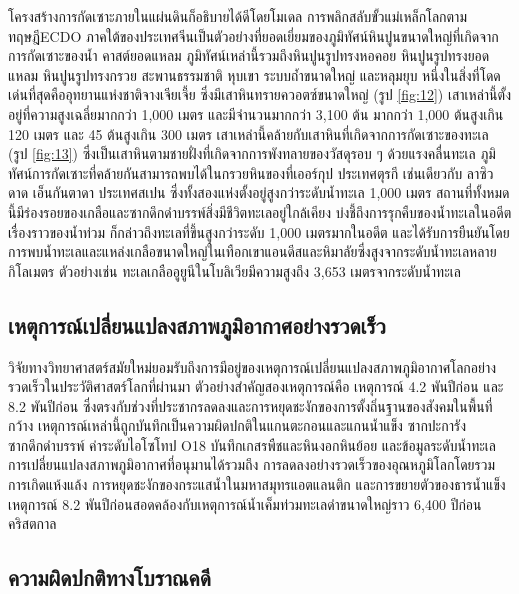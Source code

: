 \documentclass[10pt,twocolumn,letterpaper]{article}
\begin{document}
โครงสร้างการกัดเซาะภายในแผ่นดินก็อธิบายได้ดีโดยโมเดล การพลิกสลับขั้วแม่เหล็กโลกตามทฤษฎีECDO
 ภาคใต้ของประเทศจีนเป็นตัวอย่างที่ยอดเยี่ยมของภูมิทัศน์หินปูนขนาดใหญ่ที่เกิดจากการกัดเซาะของน้ำ \cite{82}  คาสต์ยอดแหลม ภูมิทัศน์เหล่านี้รวมถึงหินปูนรูปทรงหอคอย หินปูนรูปทรงยอดแหลม หินปูนรูปทรงกรวย สะพานธรรมชาติ หุบเขา ระบบถ้ำขนาดใหญ่ และหลุมยุบ หนึ่งในสิ่งที่โดดเด่นที่สุดคืออุทยานแห่งชาติจางเจียเจี้ย ซึ่งมีเสาหินทรายควอตซ์ขนาดใหญ่ (รูป \ref{fig:12}) \cite{84} เสาเหล่านี้ตั้งอยู่ที่ความสูงเฉลี่ยมากกว่า 1,000 เมตร และมีจำนวนมากกว่า 3,100 ต้น มากกว่า 1,000 ต้นสูงเกิน 120 เมตร และ 45 ต้นสูงเกิน 300 เมตร \cite{85} เสาเหล่านี้คล้ายกับเสาหินที่เกิดจากการกัดเซาะของทะเล  (รูป \ref{fig:13}) ซึ่งเป็นเสาหินตามชายฝั่งที่เกิดจากการพังทลายของวัสดุรอบ ๆ ด้วยแรงคลื่นทะเล ภูมิทัศน์การกัดเซาะที่คล้ายกันสามารถพบได้ในกรวยหินของที่เออร์กุป ประเทศตุรกี เช่นเดียวกับ ลาซิวดาด เอ็นกันตาดา ประเทศสเปน ซึ่งทั้งสองแห่งตั้งอยู่สูงกว่าระดับน้ำทะเล 1,000 เมตร สถานที่ทั้งหมดนี้มีร่องรอยของเกลือและซากดึกดำบรรพ์สิ่งมีชีวิตทะเลอยู่ใกล้เคียง บ่งชี้ถึงการรุกคืบของน้ำทะเลในอดีต \cite{15,86,87} เรื่องราวของน้ำท่วม \cite{3} ก็กล่าวถึงทะเลที่ขึ้นสูงกว่าระดับ 1,000 เมตรมากในอดีต และได้รับการยืนยันโดยการพบน้ำทะเลและแหล่งเกลือขนาดใหญ่ในเทือกเขาแอนดีสและหิมาลัยซึ่งสูงจากระดับน้ำทะเลหลายกิโลเมตร ตัวอย่างเช่น ทะเลเกลืออูยูนีในโบลิเวียมีความสูงถึง 3,653 เมตรจากระดับน้ำทะเล \cite{94}

\subsection{เหตุการณ์เปลี่ยนแปลงสภาพภูมิอากาศอย่างรวดเร็ว}

วิจัยทางวิทยาศาสตร์สมัยใหม่ยอมรับถึงการมีอยู่ของเหตุการณ์เปลี่ยนแปลงสภาพภูมิอากาศโลกอย่างรวดเร็วในประวัติศาสตร์โลกที่ผ่านมา ตัวอย่างสำคัญสองเหตุการณ์คือ เหตุการณ์ 4.2 พันปีก่อน และ 8.2 พันปีก่อน ซึ่งตรงกับช่วงที่ประชากรลดลงและการหยุดชะงักของการตั้งถิ่นฐานของสังคมในพื้นที่กว้าง เหตุการณ์เหล่านี้ถูกบันทึกเป็นความผิดปกติในแกนตะกอนและแกนน้ำแข็ง ซากปะการังซากดึกดำบรรพ์ ค่าระดับไอโซโทป O18 บันทึกเกสรพืชและหินงอกหินย้อย และข้อมูลระดับน้ำทะเล การเปลี่ยนแปลงสภาพภูมิอากาศที่อนุมานได้รวมถึง การลดลงอย่างรวดเร็วของอุณหภูมิโลกโดยรวม การเกิดแห้งแล้ง การหยุดชะงักของกระแสน้ำในมหาสมุทรแอตแลนติก และการขยายตัวของธารน้ำแข็ง \cite{90,91,92} เหตุการณ์ 8.2 พันปีก่อนสอดคล้องกับเหตุการณ์น้ำเค็มท่วมทะเลดำขนาดใหญ่ราว 6,400 ปีก่อนคริสตกาล \cite{93}

\subsection{ความผิดปกติทางโบราณคดี}
\end{document}
